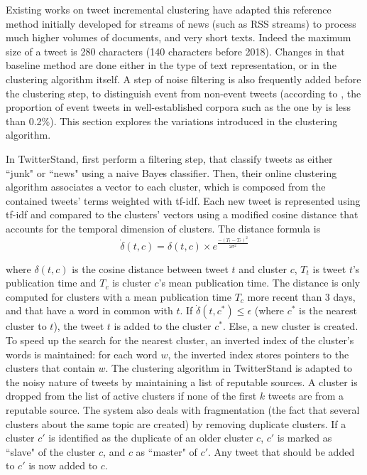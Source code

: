 Existing works on tweet incremental clustering have adapted this reference method initially developed for streams of news (such as RSS streams) to process much higher volumes of documents, and very short texts. Indeed the maximum size of a tweet is 280 characters (140 characters before 2018). Changes in that baseline method are done either in the type of text representation, or in the clustering algorithm itself. A step of noise filtering is also frequently added before the clustering step, to distinguish event from non-event tweets (according to \citet{liu_reuters_2016}, the proportion of event tweets in well-established corpora such as the one by \citet{mcminn_building_2013} is less than 0.2\%). This section explores the variations introduced in the clustering algorithm.


In TwitterStand, \citet{sankaranarayanan_twitterstand:_2009} first perform a filtering step, that classify tweets as either ``junk" or ``news" using a naive Bayes classifier. Then, their online clustering algorithm associates a vector to each cluster, which is composed from the contained tweets' terms weighted with tf-idf. Each new tweet is represented using tf-idf and compared to the clusters' vectors using a modified cosine distance that accounts for the temporal dimension of clusters. The distance formula is 
$$
\dot{\delta}(t,c) = \delta(t,c)\times e^{\frac{-(T_t-T_c)^2}{2\sigma^2}}
$$

\noindent where $\delta(t,c)$ is the cosine distance between tweet $t$ and cluster $c$, $T_t$ is tweet $t$'s publication time and $T_c$ is cluster $c$'s mean publication time. The distance is only computed for clusters with a mean publication time $T_c$ more recent than 3 days, and that have a word in common with $t$. If $\dot{\delta}(t,c^*) \leqslant \epsilon$ (where $c^*$ is the nearest cluster to $t$), the tweet $t$ is added to the cluster $c^*$. Else, a new cluster is created. To speed up the search for the nearest cluster, an inverted index of the cluster's words is maintained: for each word $w$, the inverted index stores pointers to the clusters that contain $w$. The clustering algorithm in TwitterStand is adapted to the noisy nature of tweets by maintaining a list of reputable sources. A cluster is dropped from the list of active clusters if none of the first $k$ tweets are from a reputable source. The system also deals with fragmentation (the fact that several clusters about the same topic are created) by removing duplicate clusters. If a cluster $c'$  is identified as the duplicate of an older cluster $c$, $c'$ is marked as ``slave" of the cluster $c$, and $c$ as ``master" of $c'$. Any tweet that should be added to $c'$ is now added to $c$.

